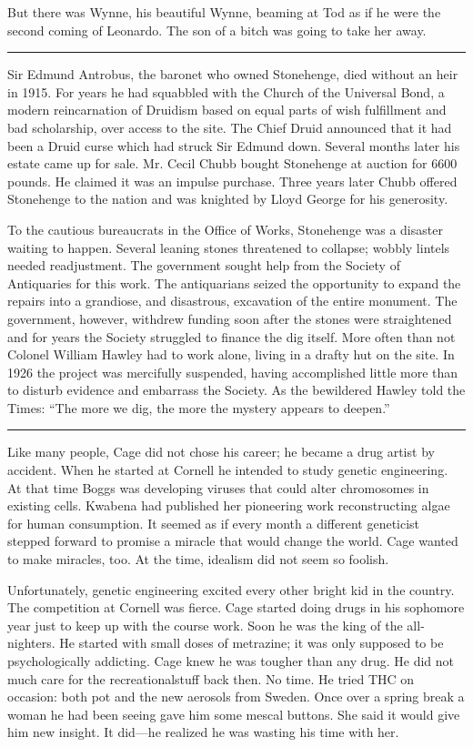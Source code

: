But there was Wynne, his beautiful Wynne, beaming at Tod as if he were the second coming of Leonardo. The son of a bitch was going to take her away.

\fancybreak{* * *}

Sir Edmund Antrobus, the baronet who owned Stonehenge, died without an heir in 1915. For years he had squabbled with the Church of the Universal Bond, a modern reincarnation of Druidism based on equal parts of wish fulfillment and bad scholarship, over access to the site. The Chief Druid announced that it had been a Druid curse which had struck Sir Edmund down. Several months later his estate came up for sale. Mr. Cecil Chubb bought Stonehenge at auction for 6600 pounds. He claimed it was an impulse purchase. Three years later Chubb offered Stonehenge to the nation and was knighted by Lloyd George for his generosity.

To the cautious bureaucrats in the Office of Works, Stonehenge was a disaster waiting to happen. Several leaning stones threatened to collapse; wobbly lintels needed readjustment. The government sought help from the Society of Antiquaries for this work. The antiquarians seized the opportunity to expand the repairs into a grandiose, and disastrous, excavation of the entire monument. The government, however, withdrew funding soon after the stones were straightened and for years the Society struggled to finance the dig itself. More often than not Colonel William Hawley had to work alone, living in a drafty hut on the site. In 1926 the project was mercifully suspended, having accomplished little more than to disturb evidence and embarrass the Society. As the bewildered Hawley told the Times: ``The more we dig, the more the mystery appears to deepen.''

\fancybreak{* * *}

Like many people, Cage did not chose his career; he became a drug artist by accident. When he started at Cornell he intended to study genetic engineering. At that time Boggs was developing viruses that could alter chromosomes in existing cells. Kwabena had published her pioneering work reconstructing algae for human consumption. It seemed as if every month a different geneticist stepped forward to promise a miracle that would change the world. Cage wanted to make miracles, too. At the time, idealism did not seem so foolish.

Unfortunately, genetic engineering excited every other bright kid in the country. The competition at Cornell was fierce. Cage started doing drugs in his sophomore year just to keep up with the course work. Soon he was the king of the all-nighters. He started with small doses of metrazine; it was only supposed to be psychologically addicting. Cage knew he was tougher than any drug. He did not much care for the recreationalstuff back then. No time. He tried THC on occasion: both pot and the new aerosols from Sweden. Once over a spring break a woman he had been seeing gave him some mescal buttons. She said it would give him new insight. It did---he realized he was wasting his time with her.

